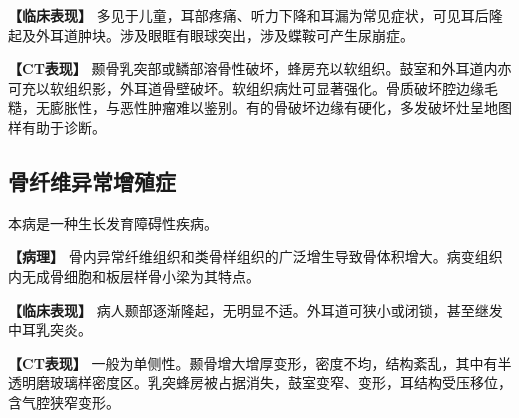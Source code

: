 \textbf{【临床表现】}
多见于儿童，耳部疼痛、听力下降和耳漏为常见症状，可见耳后隆起及外耳道肿块。涉及眼眶有眼球突出，涉及蝶鞍可产生尿崩症。

\textbf{【CT表现】}
颞骨乳突部或鳞部溶骨性破坏，蜂房充以软组织。鼓室和外耳道内亦可充以软组织影，外耳道骨壁破坏。软组织病灶可显著强化。骨质破坏腔边缘毛糙，无膨胀性，与恶性肿瘤难以鉴别。有的骨破坏边缘有硬化，多发破坏灶呈地图样有助于诊断。

\subsection{骨纤维异常增殖症}

本病是一种生长发育障碍性疾病。

\textbf{【病理】}
骨内异常纤维组织和类骨样组织的广泛增生导致骨体积增大。病变组织内无成骨细胞和板层样骨小梁为其特点。

\textbf{【临床表现】}
病人颞部逐渐隆起，无明显不适。外耳道可狭小或闭锁，甚至继发中耳乳突炎。

\textbf{【CT表现】}
一般为单侧性。颞骨增大增厚变形，密度不均，结构紊乱，其中有半透明磨玻璃样密度区。乳突蜂房被占据消失，鼓室变窄、变形，耳结构受压移位，含气腔狭窄变形。

\protect\hypertarget{text00012.html}{}{}

